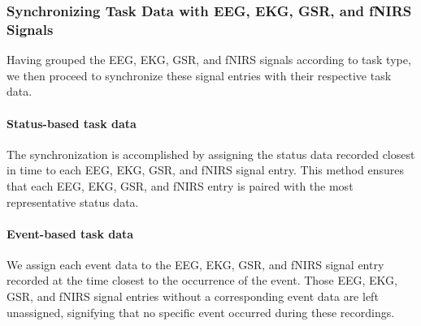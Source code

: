 \subsubsection{Synchronizing Task Data with EEG, EKG, GSR, and fNIRS Signals}

Having grouped the EEG, EKG, GSR, and fNIRS signals according to task type, we then proceed to synchronize these signal entries with their respective task data.

\paragraph{Status-based task data} The synchronization is accomplished by assigning the status data recorded closest in time to each EEG, EKG, GSR, and fNIRS signal entry. This method ensures that each EEG, EKG, GSR, and fNIRS entry is paired with the most representative status data.

\paragraph{Event-based task data} We assign each event data to the EEG, EKG, GSR, and fNIRS signal entry recorded at the time closest to the occurrence of the event. Those EEG, EKG, GSR, and fNIRS signal entries without a corresponding event data are left unassigned, signifying that no specific event occurred during these recordings.